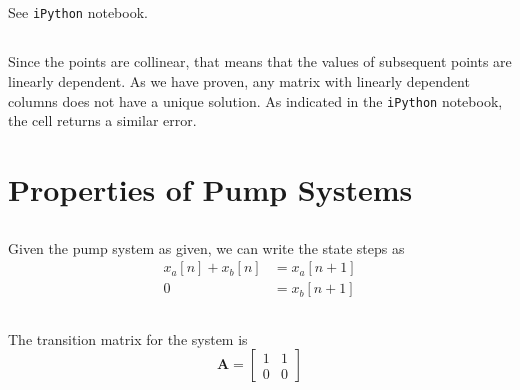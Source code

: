 \documentclass[]{article}
\begin{document}
\subsection{}

See \texttt{iPython} notebook. 

\subsection{}

Since the points are collinear, that means that the values of subsequent points are linearly dependent. As we have proven, any matrix with linearly dependent columns does not have a unique solution. As indicated in the \texttt{iPython} notebook, the cell returns a similar error. 

\section{Properties of Pump Systems}

\subsection{}

Given the pump system as given, we can write the state steps as
\begin{align}
	x_a[n] + x_b[n] &= x_a[n + 1] \\
	0 &= x_b[n + 1]
\end{align}

\subsection{}

The transition matrix for the system is
\begin{equation}
	\mathbf{A} = 
	\begin{bmatrix}
	1 & 1 \\
	0 & 0
	\end{bmatrix}
\end{equation}

\subsection{}
\end{document}
